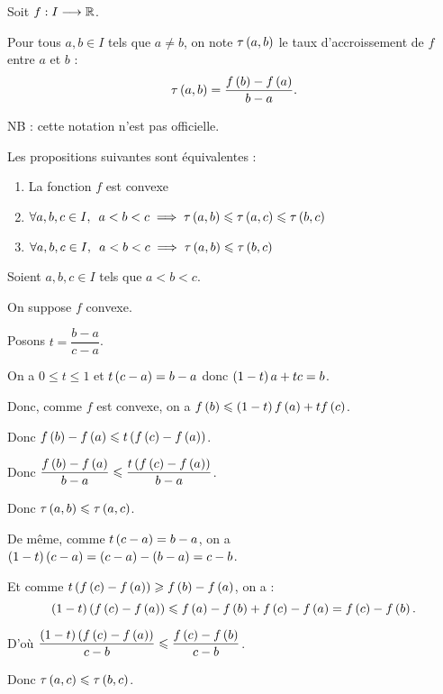 \begin{prop}
Soit \(f:I\longrightarrow\mathbb{R}\).

Pour tous \(a,b\in I\) tels que \(a\not=b\), on note \(\tau\left(a,b\right)\) le taux d'accroissement de \(f\) entre \(a\) et \(b\) : \[\tau\left(a,b\right)=\dfrac{f\left(b\right)-f\left(a\right)}{b-a}.\]

NB : cette notation n'est pas officielle.

Les propositions suivantes sont équivalentes :

\begin{enumerate}
\item La fonction \(f\) est convexe \\

\item \(\quantifs{\forall a,b,c\in I}a<b<c\imp\tau\paren{a,b}\leq\tau\paren{a,c}\leq\tau\paren{b,c}\) \\

\item \(\quantifs{\forall a,b,c\in I}a<b<c\imp\tau\paren{a,b}\leq\tau\paren{b,c}\)
\end{enumerate}
\end{prop}

\begin{dem}[(1) \(\imp\) (2)]
Soient \(a,b,c\in I\) tels que \(a<b<c\).

On suppose \(f\) convexe.

Posons \(t=\dfrac{b-a}{c-a}\).

On a \(0\leq t\leq1\) et \(t\left(c-a\right)=b-a\) donc \(\left(1-t\right)a+tc=b\).

Donc, comme \(f\) est convexe, on a \(f\left(b\right)\leqslant\left(1-t\right)f\left(a\right)+tf\left(c\right)\).

Donc \(f\left(b\right)-f\left(a\right)\leqslant t\left(f\left(c\right)-f\left(a\right)\right)\).

Donc \(\dfrac{f\left(b\right)-f\left(a\right)}{b-a}\leqslant\dfrac{t\left(f\left(c\right)-f\left(a\right)\right)}{b-a}\).

Donc \(\tau\left(a,b\right)\leqslant\tau\left(a,c\right)\).

De même, comme \(t\left(c-a\right)=b-a\), on a \(\left(1-t\right)\left(c-a\right)=\left(c-a\right)-\left(b-a\right)=c-b\).

Et comme \(t\left(f\left(c\right)-f\left(a\right)\right)\geqslant f\left(b\right)-f\left(a\right)\), on a : \[\left(1-t\right)\left(f\left(c\right)-f\left(a\right)\right)\leqslant f\left(a\right)-f\left(b\right)+f\left(c\right)-f\left(a\right)=f\left(c\right)-f\left(b\right).\]

D'où \(\dfrac{\left(1-t\right)\left(f\left(c\right)-f\left(a\right)\right)}{c-b}\leqslant\dfrac{f\left(c\right)-f\left(b\right)}{c-b}\).

Donc \(\tau\left(a,c\right)\leqslant\tau\left(b,c\right)\).
\end{dem}

